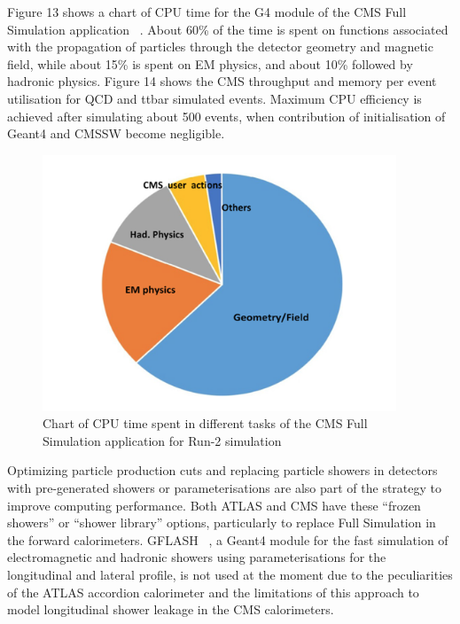 \documentclass[12pt,a4paper]{article}
\begin{document}
{Figure 13 shows a chart of CPU time for the G4 module of the CMS Full
Simulation application ~\cite{Hildreth:2017vpw}. About 60\% of the time is spent on
functions associated with the propagation of particles through the
detector geometry and magnetic field, while about 15\% is spent on EM
physics, and about 10\% followed by hadronic physics. Figure 14 shows
the CMS throughput and memory per event utilisation for QCD and ttbar
simulated events. Maximum CPU efficiency is achieved after
simulating about 500 events, when contribution of initialisation of
Geant4 and CMSSW become negligible.

\begin{figure}[bthp]
\vspace*{0.3cm}
\centering
\includegraphics[width=0.94\textwidth]{image13.png}
\caption{Chart of CPU time spent in different tasks of the CMS
Full Simulation application for Run-2 simulation}
\label{fig:perfcpucms}
\end{figure}

Optimizing particle production cuts and replacing particle showers in
detectors with pre-generated showers or parameterisations are also part
of the strategy to improve computing performance. Both ATLAS and CMS
have these ``frozen showers'' or ``shower library'' options,
particularly to replace Full Simulation in the forward calorimeters.
GFLASH ~\cite{GRINDHAMMER1990469}, a Geant4 module for the fast simulation of
electromagnetic and hadronic showers using parameterisations for the
longitudinal and lateral profile, is not used at the moment due to the
peculiarities of the ATLAS accordion calorimeter and the limitations of
this approach to model longitudinal shower leakage in the CMS
calorimeters.

}
\end{document}

